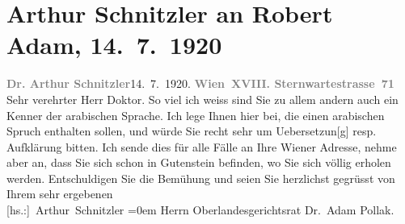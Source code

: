 

               \section[Arthur Schnitzler an Robert Adam, 14. 7. 1920]{ Arthur Schnitzler an Robert Adam, 14. 7. 1920}\nopagebreak{}\rehead{ }\begin{ledgroupsized}[t]{13cm}\normalsize\beginnumbering{} \toendnotes[C]{\smallbreak\pagebreak[2]} 
\toendnotes[C]{\smallbreak}\pstart
           \noindent{}{\pb}\textcolor{gray}{\textbf{Dr. Arthur Schnitzler}}\hfill 14. 7. 1920.\pend
           \pstart
           \textcolor{gray}{\textbf{Wien XVIII. Sternwartestrasse 71}}\pend
           \pstart{}Sehr verehrter Herr Doktor.\pend\pstart
           So viel ich weiss sind Sie zu allem andern auch ein Kenner der arabischen
                    Sprache. Ich lege Ihnen hier \label{K_L02349_1v}\label{K_L02349_1h} bei, die einen arabischen Spruch enthalten sollen, und
                    würde Sie recht sehr um Uebersetzun{[}g{]} resp. Aufklärung
                    bitten. Ich sende dies für alle Fälle an Ihre Wiener Adresse, nehme aber an, dass Sie sich schon in Gutenstein befinden, wo Sie sich völlig erholen
                    werden.\pend
           \pstart
           Entschuldigen Sie die Bemühung und seien Sie herzlichst gegrüsst
                    von{\\[\baselineskip]}Ihrem sehr ergebenen{\\[\baselineskip]}\spacefill\mbox{{[}hs.:{]} Arthur Schnitzler}\pend
           \leftskip=0em{}\pstart
           \noindent{}Herrn Oberlandesgerichtsrat Dr. Adam Pollak.\pend
                     \endnumbering{}\end{ledgroupsized}  \newcommand{\dateiname}{L02349}\newcommand{\titel}{Arthur Schnitzler an Robert Adam, 14. 7. 1920}\newcommand{\editorInnen}{Martin Anton Müller und Gerd-Hermann Susen}
            \footnotesize
\begin{ledgroupsized}[t]{11.5cm}
\end{ledgroupsized}
         
      